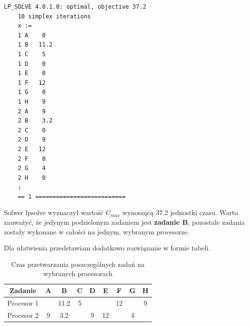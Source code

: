 \documentclass[
    12pt, %
]{../fphw}
\begin{document}
\newpage

\begin{lstlisting}[caption=Rozwiązanie znalezione solwerem lpsolve]
    LP_SOLVE 4.0.1.0: optimal, objective 37.2
    10 simplex iterations
    x :=
    1 A    0
    1 B   11.2
    1 C    5
    1 D    0
    1 E    0
    1 F   12
    1 G    0
    1 H    9
    2 A    9
    2 B    3.2
    2 C    0
    2 D    9
    2 E   12
    2 F    0
    2 G    4
    2 H    0
    ;
    == 1 ==========================
\end{lstlisting}
Solwer lpsolve wyznaczył wartość \(C_{max}\) wynoszącą \(37.2\) jednostki czasu.
Warto zauważyć, że jedynym podzielonym zadaniem jest \textbf{zadanie B},
pozostałe zadania zostały wykonane w całości na jednym, wybranym procesorze.

Dla ułatwienia przedstawiam dodatkowo rozwiązanie w formie tabeli.
\begin{table}[H]
    \centering
    \begin{tabular}{| c | c | c | c | c | c | c | c | c |}
        \hline
        Zadanie    & A & B    & C & D & E  & F  & G & H \\
        \hline
        Procesor 1 &   & 11.2 & 5 &   &    & 12 &   & 9 \\
        \hline
        Procesor 2 & 9 & 3.2  &   & 9 & 12 &    & 4 &   \\
        \hline
    \end{tabular}
    \caption{Czas przetwarzania poszczególnych zadań na wybranych procesorach}
\end{table}

\newpage
\end{document}
